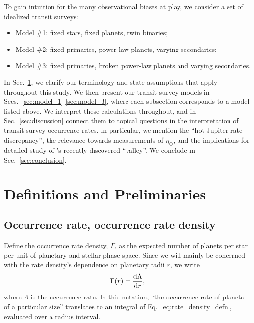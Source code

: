 \documentclass[12pt,modern]{aastex61}
\begin{document}
To gain intuition for the many observational biases at play,
we consider a set of idealized transit surveys:
\begin{itemize}
    \item Model \#1: fixed stars, fixed planets, twin binaries;
    \item Model \#2: fixed primaries, power-law planets, varying secondaries;
    \item Model \#3: fixed primaries, broken power-law planets and varying 
    secondaries.
\end{itemize}
In Sec.~\ref{sec:definitions}, we clarify our terminology and state
assumptions that apply throughout this study.
We then present our transit survey models in 
Secs.~\ref{sec:model_1}-\ref{sec:model_3}, where 
each subsection corresponds to a model listed above.
We interpret these calculations throughout, and in 
Sec.~\ref{sec:discussion} connect them to topical questions in 
the interpretation of transit survey occurrence rates.
In particular, we mention the ``hot Jupiter rate discrepancy'', the relevance 
towards measurements of $\eta_\oplus$, and the implications for detailed 
study of \citet{fulton_california-_2017}'s recently discovered ``valley''.
We conclude in Sec.~\ref{sec:conclusion}.

%

\section{Definitions and Preliminaries}
\label{sec:definitions}

\subsection{Occurrence rate, occurrence rate density}
Define the occurrence rate density, $\Gamma$, as the expected number of 
planets per star per unit of planetary and stellar phase space.
Since we will mainly be concerned with the rate density's dependence on 
planetary radii $r$, we write
\begin{equation}
\Gamma(r) = \frac{{\rm d}\Lambda}{{\rm d}r},
\label{eq:rate_density_defn}
\end{equation}
where $\Lambda$ is the occurrence rate.
In this notation, ``the occurrence rate of planets of a particular size'' 
translates to an integral of Eq.~\ref{eq:rate_density_defn}, evaluated over a 
radius interval.
\end{document}
